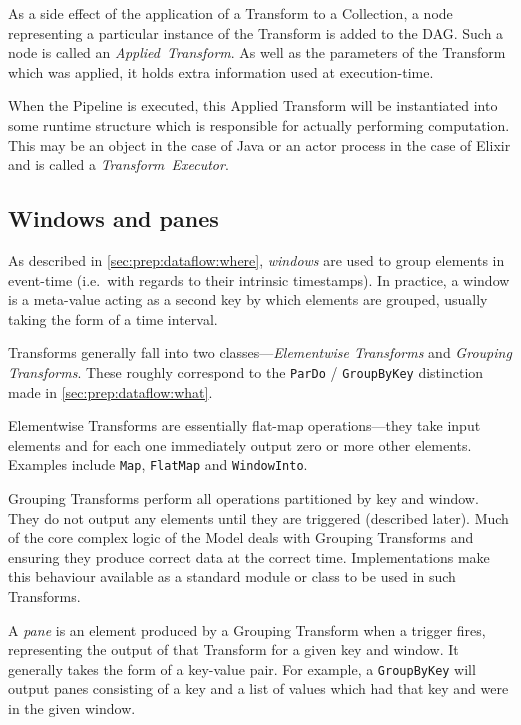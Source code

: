 As a side effect of the application of a Transform to a Collection, a node representing a particular instance of the Transform is added to the DAG.
Such a node is called an \emph{Applied~Transform}.
As well as the parameters of the Transform which was applied, it holds extra information used at execution-time.

When the Pipeline is executed, this Applied Transform will be instantiated into some runtime structure which is responsible for actually performing computation.
This may be an object in the case of Java or an actor process in the case of Elixir and is called a \emph{Transform~Executor}.

\subsection{Windows and panes}\label{sec:impl:dataflow:windows-panes}

As described in \cref{sec:prep:dataflow:where}, \emph{windows} are used to group elements in event-time (i.e.\ with regards to their intrinsic timestamps).
In practice, a window is a meta-value acting as a second key by which elements are grouped, usually taking the form of a time interval.

Transforms generally fall into two classes---\emph{Elementwise Transforms} and \emph{Grouping Transforms}.
These roughly correspond to the \verb|ParDo| / \verb|GroupByKey| distinction made in \cref{sec:prep:dataflow:what}.

Elementwise Transforms are essentially flat-map operations---they take input elements and for each one immediately output zero or more other elements.
Examples include \verb|Map|, \verb|FlatMap| and \verb|WindowInto|.

Grouping Transforms perform all operations partitioned by key and window.
They do not output any elements until they are triggered (described later).
Much of the core complex logic of the Model deals with Grouping Transforms and ensuring they produce correct data at the correct time.
Implementations make this behaviour available as a standard module or class to be used in such Transforms.

A \emph{pane} is an element produced by a Grouping Transform when a trigger fires, representing the output of that Transform for a given key and window.
It generally takes the form of a key-value pair.
For example, a \verb|GroupByKey| will output panes consisting of a key and a list of values which had that key and were in the given window.

